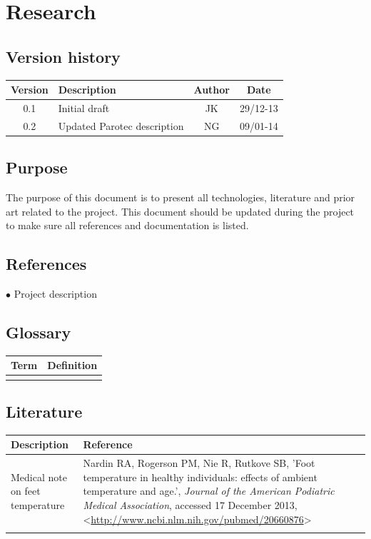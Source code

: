 \chapter{Research}
\section{Version history}
\begin{table}[H]
\begin{tabular}{|c|p{9cm}|c|c|}
\hline
Version & Description & Author & Date\\
\hline
0.1 & Initial draft & JK & 29/12-13\\
\hline
0.2 & Updated Parotec description & NG & 09/01-14\\
\hline
\end{tabular}
\end{table}

\section{Purpose}
The purpose of this document is to present all technologies, literature and prior art related to the project. This document should be updated during the project to make sure all references and documentation is listed.

\section{References}
$\bullet$ Project description

\section{Glossary}
\begin{table}[H]
\centering
\begin{tabular}{|p{4cm}|p{7cm}|}
\hline
Term & Definition\\ \hline
&\\ \hline
\end{tabular}
\end{table}

\section{Literature}


\begin{table}[H]
\centering
\begin{tabular}{|p{4cm}|p{10cm}|}
\hline
Description & Reference\\ \hline
Medical note on feet temperature&Nardin RA, Rogerson PM, Nie R, Rutkove SB, 'Foot temperature in healthy individuals: effects of ambient temperature and age.', \textit{Journal of the American Podiatric Medical Association}, accessed 17 December 2013, <\url{http://www.ncbi.nlm.nih.gov/pubmed/20660876}>\\ \hline
& \\ \hline
\end{tabular}
\end{table}


